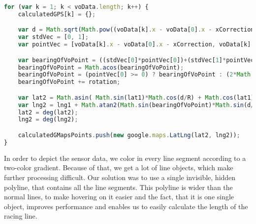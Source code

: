 \begin{lstlisting}[language=JavaScript]
for (var k = 1; k < voData.length; k++) {
	calculatedGPS[k] = {};

	var d = Math.sqrt(Math.pow((voData[k].x - voData[0].x - xCorrection), 2) + Math.pow((voData[k].y - voData[0].y - yCorrection), 2)) * voScaleFactor / 1000;
	var stdVec = [0, 1];
	var pointVec = [voData[k].x - voData[0].x - xCorrection, voData[k].y - voData[0].y - yCorrection];

	var bearingOfVoPoint = ((stdVec[0]*pointVec[0])+(stdVec[1]*pointVec[1]))/(Math.sqrt(Math.pow(stdVec[0], 2)+Math.pow(stdVec[1], 2))*Math.sqrt(Math.pow(pointVec[0], 2)+Math.pow(pointVec[1], 2)));
	bearingOfVoPoint = Math.acos(bearingOfVoPoint);
	bearingOfVoPoint = (pointVec[0] >= 0) ? bearingOfVoPoint : (2*Math.PI)-bearingOfVoPoint;
	bearingOfVoPoint += rotation;

	var lat2 = Math.asin( Math.sin(lat1)*Math.cos(d/R) + Math.cos(lat1)*Math.sin(d/R)*Math.cos(bearingOfVoPoint) );
	var lng2 = lng1 + Math.atan2(Math.sin(bearingOfVoPoint)*Math.sin(d/R)*Math.cos(lat1), Math.cos(d/R)-Math.sin(lat1)*Math.sin(lat2));
	lat2 = deg(lat2);
	lng2 = deg(lng2);

	calculatedGMapsPoints.push(new google.maps.LatLng(lat2, lng2));
}
\end{lstlisting}

In order to depict the sensor data, we color in every line segment according to a two-color gradient. Because of that, we get a lot of line objects, which make further processing difficult. Our solution was to use a single invisible, hidden polyline, that contains all the line segments. This polyline is wider than the normal lines, to make hovering on it easier and the fact, that it is one single object, improves performance and enables us to easily calculate the length of the racing line.

\clearpage